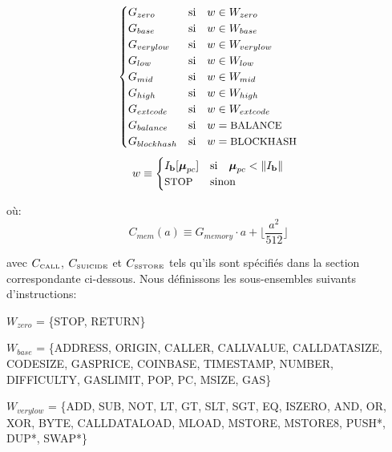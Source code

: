 \documentclass[9pt,oneside]{amsart}
\begin{document}
\begin{equation}
\begin{cases}
G_{zero} & \text{si} \quad w \in W_{zero}\\
G_{base} & \text{si} \quad w \in W_{base}\\
G_{verylow} & \text{si} \quad w \in W_{verylow}\\
G_{low} & \text{si} \quad w \in W_{low}\\
G_{mid} & \text{si} \quad w \in W_{mid}\\
G_{high} & \text{si} \quad w \in W_{high}\\
G_{extcode} & \text{si} \quad w \in W_{extcode}\\
G_{balance} & \text{si} \quad w = \text{\small BALANCE}\\
G_{blockhash} & \text{si} \quad w = \text{\small BLOCKHASH}\\
\end{cases}
\end{equation}
\begin{equation}
w \equiv \begin{cases} I_\mathbf{b}[\boldsymbol{\mu}_{pc}] & \text{si} \quad \boldsymbol{\mu}_{pc} < \lVert I_\mathbf{b} \rVert\\
\text{\small STOP} & \text{sinon}
\end{cases}
\end{equation}

où:
\begin{equation}
C_{mem}(a) \equiv G_{memory} \cdot a + \Big\lfloor \dfrac{a^2}{512} \Big\rfloor
\end{equation}

avec $C_\text{\tiny CALL}$, $C_\text{\tiny SUICIDE}$ et $C_\text{\tiny SSTORE}$ tels qu'ils sont spécifiés dans la section correspondante ci-dessous. Nous définissons les sous-ensembles suivants d'instructions:

$W_{zero}$ = \{{\small STOP}, {\small RETURN}\}

$W_{base}$ = \{{\small ADDRESS}, {\small ORIGIN}, {\small CALLER}, {\small CALLVALUE}, {\small CALLDATASIZE}, {\small CODESIZE}, {\small GASPRICE}, {\small COINBASE},\newline \noindent\hspace*{1cm} {\small TIMESTAMP}, {\small NUMBER}, {\small DIFFICULTY}, {\small GASLIMIT}, {\small POP}, {\small PC}, {\small MSIZE}, {\small GAS}\}

$W_{verylow}$ = \{{\small ADD}, {\small SUB}, {\small NOT}, {\small LT}, {\small GT}, {\small SLT}, {\small SGT}, {\small EQ}, {\small ISZERO}, {\small AND}, {\small OR}, {\small XOR}, {\small BYTE}, {\small CALLDATALOAD}, \newline \noindent\hspace*{1cm} {\small MLOAD}, {\small MSTORE}, {\small MSTORE8}, {\small PUSH*}, {\small DUP*}, {\small SWAP*}\}
\end{document}
